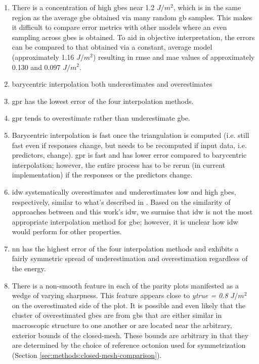 \documentclass[preprint,12pt]{elsarticle}
\begin{document}
\begin{enumerate}
    \item There is a concentration of high \glspl{gbe} near 1.2 $J/m^2$, which is in the same region as the average \gls{gbe} obtained via many random \gls{gb} samples. This makes it difficult to compare error metrics with other models where an even sampling across \glspl{gbe} is obtained. To aid in objective interpretation, the errors can be compared to that obtained via a constant, average model (approximately 1.16 $J/m^2$) resulting in \gls{rmse} and \gls{mae} values of approximately 0.130 and 0.097 $J/m^2$.
    \item barycentric interpolation both underestimates and overestimates
    \item \Gls{gpr} has the lowest error of the four interpolation methods.
    \item \Gls{gpr} tends to overestimate rather than underestimate \gls{gbe}.
    \item Barycentric interpolation is fast once the triangulation is computed (i.e. still fast even if responses change, but needs to be recomputed if input data, i.e. predictors, change). \Gls{gpr} is fast and has lower error compared to barycentric interpolation; however, the entire process has to be rerun (in current implementation) if the responses or the predictors change.
    \item \Gls{idw} systematically overestimates and underestimates low and high \glspl{gbe}, respectively, similar to what's described in \cite{chesserLearningGrainBoundary2020}. Based on the similarity of approaches between \cite{chesserLearningGrainBoundary2020} and this work's \gls{idw}, we surmise that \gls{idw} is not the most appropriate interpolation method for \gls{gbe}; however, it is unclear how \gls{idw} would perform for other properties.
    \item \Gls{nn} has the highest error of the four interpolation methods and exhibits a fairly symmetric spread of underestimation and overestimation regardless of the energy.
    \item There is a non-smooth feature in each of the parity plots manifested as a wedge of varying sharpness. This feature appears close to \textit{ytrue = 0.8 $J/m^2$} on the overestimated side of the plot. It is possible and even likely that the cluster of overestimated \glspl{gbe} are from \glspl{gb} that are either similar in macroscopic structure to one another or are located near the arbitrary, exterior bounds of the closed-mesh. These bounds are arbitrary in that they are determined by the choice of reference octonion used for symmetrization (Section \ref{sec:methods:closed-mesh-comparison}).
\end{enumerate}
\end{document}
